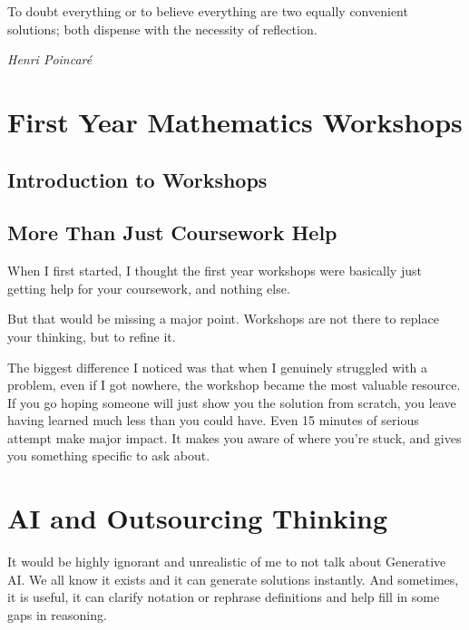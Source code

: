 \epigraph{To doubt everything or to believe everything are two equally convenient solutions; both dispense with the necessity of reflection.}
{\textit{Henri Poincaré}}

\section{First Year Mathematics Workshops}

\subsection{Introduction to Workshops}






\subsection{More Than Just Coursework Help}

When I first started, I thought the first year workshops were basically just getting help for your coursework, and nothing else. 

But that would be missing a major point. Workshops are not there to replace your thinking, but to refine it. 

The biggest difference I noticed was that when I genuinely struggled with a problem, even if I got nowhere, the workshop became the most valuable resource. If you go hoping someone will just show you the solution from scratch, you leave having learned much less than you could have. Even 15 minutes of serious attempt make major impact. It makes you aware of where you're stuck, and gives you something specific to ask about. 

\section{AI and Outsourcing Thinking}

It would be highly ignorant and unrealistic of me to not talk about Generative AI. We all know it exists and it can generate solutions instantly. And sometimes, it is useful, it can clarify notation or rephrase definitions and help fill in some gaps in reasoning.

